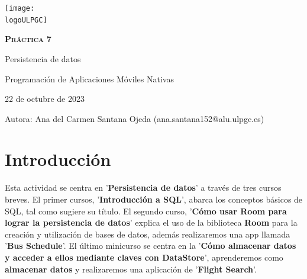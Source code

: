 \documentclass[a4paper]{article}
\newcommand{\dateToday}{22 de octubre de 2023}
\newcommand{\logoULPGC}{imagenes/ulpgc.png}
\newcommand{\portada}{imagenes/portada.png}
\begin{document}
    \begin{titlepage}
        \centering
        \vspace*{2cm}
        \texttt{[image: \\logoULPGC]}\par\vspace{1cm}
    
        {\scshape\textbf{\LARGE Práctica 7}}\par
        \vspace{0.6cm}
        {\bfseries}{\Huge Persistencia de datos}
        \vspace{2cm}
    
        \centering
        \vspace{1cm} 
        
        \begin{tcolorbox}[colback=green!5!white,colframe=white!50!black]
            \centering \Large Programación de Aplicaciones Móviles Nativas \par
            \dateToday
        \end{tcolorbox}

        \vspace{1cm}        
        \begin{tcolorbox}[colback=green!5!white,colframe=white!75!black]
            Autora:
            \tcblower
            Ana del Carmen Santana Ojeda (ana.santana152@alu.ulpgc.es)
        \end{tcolorbox}
    \end{titlepage}
    
    \newpage
        
    \tableofcontents 
    
    \newpage

    \section{Introducción}

    Esta actividad se centra en '\textbf{Persistencia de datos}' a través de tres cursos breves. El primer cursos, '\textbf{Introducción a SQL}', abarca los conceptos básicos de SQL, tal como sugiere su título. El segundo curso, '\textbf{Cómo usar Room para lograr la persistencia de datos}' explica el uso de la biblioteca \textbf{Room} para la creación y utilización de bases de datos, además realizaremos una app llamada '\textbf{Bus Schedule}'. El último minicurso se centra en la '\textbf{Cómo almacenar datos y acceder a ellos mediante claves con DataStore}', aprenderemos como \textbf{almacenar datos} y realizaremos una aplicación de '\textbf{Flight Search}'.
    
\end{document}
